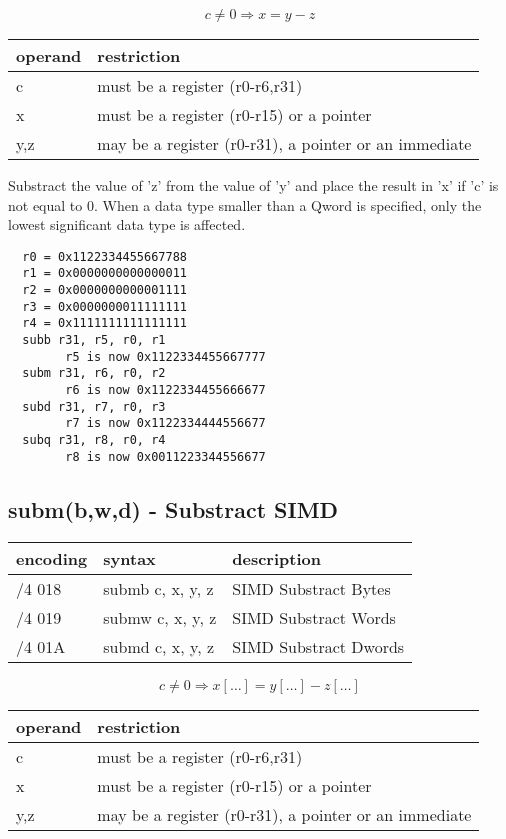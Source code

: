 \documentclass[letterpaper,10pt,openright,twoside,onecolumn]{book}
\begin{document}
  \begin{displaymath} c \neq 0 \Rightarrow x = y - z\end{displaymath}

  \flushleft
  \begin{tabular}{|l|l|}
   \hline
    operand & restriction \\
   \hline
    c & must be a register (r0-r6,r31) \\
    x & must be a register (r0-r15) or a pointer \\
    y,z & may be a register (r0-r31), a pointer or an immediate \\
   \hline
  \end{tabular}

  Substract the value of 'z' from the value of 'y' and place the result
  in 'x' if 'c' is not equal to 0.
  When a data type smaller than a Qword is specified, only the
  lowest significant data type is affected.

  \begin{verbatim}
  r0 = 0x1122334455667788
  r1 = 0x0000000000000011
  r2 = 0x0000000000001111
  r3 = 0x0000000011111111
  r4 = 0x1111111111111111
  subb r31, r5, r0, r1
        r5 is now 0x1122334455667777
  subm r31, r6, r0, r2
        r6 is now 0x1122334455666677
  subd r31, r7, r0, r3
        r7 is now 0x1122334444556677
  subq r31, r8, r0, r4
        r8 is now 0x0011223344556677
  \end{verbatim}
\newpage\subsection{subm(b,w,d) - Substract SIMD}
  \begin{tabular}{|l|l|l|}
   \hline
    encoding & syntax & description \\
   \hline
    /4 018 & submb c, x, y, z & SIMD Substract Bytes \\
    /4 019 & submw c, x, y, z & SIMD Substract Words \\
    /4 01A & submd c, x, y, z & SIMD Substract Dwords \\
   \hline
  \end{tabular}

  \begin{displaymath} c \neq 0 \Rightarrow x[\ldots] = y[\ldots] - z[\ldots]\end{displaymath}

  \flushleft
  \begin{tabular}{|l|l|}
   \hline
    operand & restriction \\
   \hline
    c & must be a register (r0-r6,r31) \\
    x & must be a register (r0-r15) or a pointer \\
    y,z & may be a register (r0-r31), a pointer or an immediate \\
   \hline
  \end{tabular}
\end{document}

